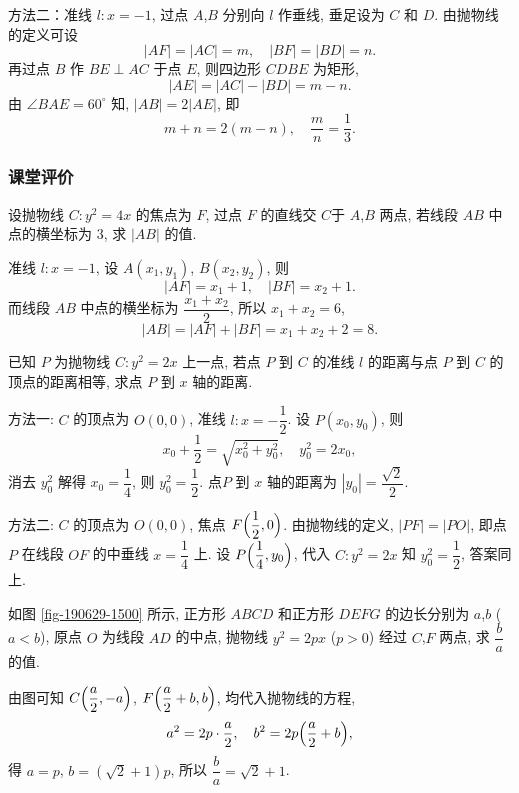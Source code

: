     方法二：准线 $l\colon x=-1$, 过点 $A$,$B$ 分别向 $l$ 作垂线, 垂足设为 $C$ 和 $D$. 由抛物线的定义可设
    \[|AF|= |AC|= m,\quad |BF|= |BD|= n.\]
    再过点 $B$ 作 $BE\perp AC$ 于点 $E$, 则四边形 $CDBE$ 为矩形, 
    \[|AE|= |AC|- |BD|= m-n.\]
    由 $\angle BAE= 60^\circ$ 知, $|AB|= 2|AE|$, 即
    \[m+n= 2(m-n),\quad \frac{m}{n}= \frac13.\]
\endsolution

\subsubsection{课堂评价}
\begin{exercise}
    设抛物线 $C\colon y^2 =4x$ 的焦点为 $F$, 过点 $F$ 的直线交 $C$于 $A$,$B$ 两点, 若线段 $AB$ 中点的横坐标为 $3$, 求 $|AB|$ 的值.
\end{exercise}
\beginsolution
    准线 $l\colon x=-1$, 设 $A(x_1,y_1)$, $B(x_2,y_2)$, 则
    \[|AF|= x_1+1,\quad |BF|= x_2+1.\]
    而线段 $AB$ 中点的横坐标为 $\dfrac{x_1+x_2}2$, 所以 $x_1+x_2= 6$,
    \[|AB|= |AF|+|BF|= x_1+x_2+2= 8.\]
\endsolution

\begin{exercise}
    已知 $P$ 为抛物线 $C\colon y^2 =2x$ 上一点, 若点 $P$ 到 $C$ 的准线 $l$ 的距离与点 $P$ 到 $C$ 的顶点的距离相等, 求点 $P$ 到 $x$ 轴的距离.
\end{exercise}
\beginsolution
    方法一: $C$ 的顶点为 $O(0,0)$, 准线 $l\colon x= -\dfrac12$. 设 $P(x_0,y_0)$, 则
    \[x_0+ \frac12= \sqrt{x_0^2+ y_0^2},\quad
    y_0^2= 2x_0,\]
    消去 $y_0^2$ 解得 $x_0= \dfrac14$, 则 $y_0^2= \dfrac12$. 点$P$ 到 $x$ 轴的距离为 $|y_0|= \dfrac{\sqrt2}2$.

    方法二: $C$ 的顶点为 $O(0,0)$, 焦点 $F\Bigl(\dfrac12,0\Bigr)$. 由抛物线的定义, $|PF|= |PO|$, 即点 $P$ 在线段 $OF$ 的中垂线 $x= \dfrac14$ 上. 设 $P\Bigl(\dfrac14,y_0\Bigr)$, 代入 $C\colon y^2 =2x$ 知 $y_0^2= \dfrac12$, 答案同上.
\endsolution

\begin{exercise}
    如图 \ref{fig-190629-1500} 所示, 正方形 $ABCD$ 和正方形 $DEFG$ 的边长分别为 $a$,$b$ ($a<b$), 原点 $O$ 为线段 $AD$ 的中点, 抛物线 $y^2 =2px$ ($p>0$) 经过 $C$,$F$ 两点, 求 $\dfrac{b}{a}$ 的值.
\end{exercise}
\beginsolution
    由图可知 $C\Bigl(\dfrac{a}2,-a\Bigr)$, $F\Bigl(\dfrac{a}2+b,b\Bigr)$, 均代入抛物线的方程,
    \[a^2= 2p\cdot \frac{a}2,\quad
    b^2= 2p\Bigl(\frac{a}2+b\Bigr),\]
    得 $a=p$, $b= (\sqrt2+1)p$, 所以 $\dfrac{b}{a}= \sqrt2+1$. 
\endsolution

